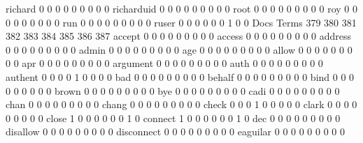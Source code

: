 \documentclass[compress,8pt]{beamer}
\begin{document}
\begin{frame}
\begin{Schunk}
  richard                                    0   0   0   0   0   0   0   0   0
  richarduid                                 0   0   0   0   0   0   0   0   0
  root                                       0   0   0   0   0   0   0   0   0
  roy                                        0   0   0   0   0   0   0   0   0
  run                                        0   0   0   0   0   0   0   0   0
  ruser                                      0   0   0   0   0   0   1   0   0
                                          Docs
Terms                                      379 380 381 382 383 384 385 386 387
  accept                                     0   0   0   0   0   0   0   0   0
  access                                     0   0   0   0   0   0   0   0   0
  address                                    0   0   0   0   0   0   0   0   0
  admin                                      0   0   0   0   0   0   0   0   0
  age                                        0   0   0   0   0   0   0   0   0
  allow                                      0   0   0   0   0   0   0   0   0
  apr                                        0   0   0   0   0   0   0   0   0
  argument                                   0   0   0   0   0   0   0   0   0
  auth                                       0   0   0   0   0   0   0   0   0
  authent                                    0   0   0   0   1   0   0   0   0
  bad                                        0   0   0   0   0   0   0   0   0
  behalf                                     0   0   0   0   0   0   0   0   0
  bind                                       0   0   0   0   0   0   0   0   0
  brown                                      0   0   0   0   0   0   0   0   0
  bye                                        0   0   0   0   0   0   0   0   0
  cadi                                       0   0   0   0   0   0   0   0   0
  chan                                       0   0   0   0   0   0   0   0   0
  chang                                      0   0   0   0   0   0   0   0   0
  check                                      0   0   0   1   0   0   0   0   0
  clark                                      0   0   0   0   0   0   0   0   0
  close                                      1   0   0   0   0   0   0   1   0
  connect                                    1   0   0   0   0   0   0   1   0
  dec                                        0   0   0   0   0   0   0   0   0
  disallow                                   0   0   0   0   0   0   0   0   0
  disconnect                                 0   0   0   0   0   0   0   0   0
  eaguilar                                   0   0   0   0   0   0   0   0   0

\end{Schunk}
\end{frame}
\end{document}

